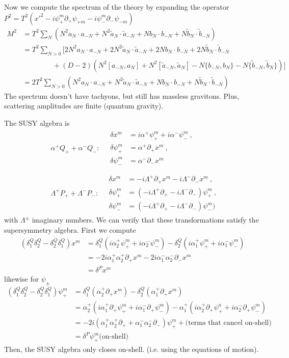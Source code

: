 \documentclass[a4paper,12pt]{article}
\numberwithin{equation}{section}
\numberwithin{exe}{section}
\newcommand{\p}{{\partial}}
\newcommand{\at}{{\tilde a}}
\renewcommand{\a}{{\alpha}}
\renewcommand{\d}{{\delta}}
\renewcommand{\L}{{\Lambda}}
\begin{document}
Now we compute the spectrum of the theory by expanding the operator $P^2 = T^2(x'^2 - i\psi^m_+\p_+\psi_{+m}-i\psi^m_-\p_-\psi_{-m})$
	\begin{align}
	M^2 & = T^2 \sum_N(N^2 a_N\cdot a_{-N} + N^2 \at_N\cdot \at_{-N} + N b_N\cdot b_{-N} + N{\tilde b}_N\cdot {\tilde b}_{-N}) \nonumber \\
	& = T^2 \sum_{N>0} [ 2N^2 a_N\cdot a_{-N} + 2 N^2 \at_N\cdot \at_{-N} + 2N b_N\cdot b_{-N} + 2N{\tilde b}_N\cdot {\tilde b}_{-N} \nonumber \\
	& \qquad\qquad\ +(D-2)(N^2[a_{-N},a_N] + N^2 [\at_{-N},\at_N]- N\{b_{-N},b_N\} - N\{{\tilde b}_{-N},{\tilde b}_N\}) ] \nonumber \\
	& = 2 T^2 \sum_{N>0} (N^2 a_N\cdot a_{-N} + N^2 \at_N\cdot \at_{-N} + N b_N\cdot b_{-N} + N{\tilde b}_N\cdot {\tilde b}_{-N})
	\end{align}
The spectrum doesn't have tachyons, but still has massless gravitons. Plus, scattering amplitudes are finite (quantum gravity).

The SUSY algebra is
	\begin{align}
	&\a^+Q_+ + \a^- Q_-: \quad
		\begin{aligned}
		\d x^m & = i\a^+\psi^m_+ + i\a^-\psi^m_- \ , \\
		\d\psi^m_+ & = \a^+\p_+ x^m\ , \\
		\d\psi^m_- & = \a^-\p_- x^m
		\end{aligned}
	\\
	& \nonumber \\
	& \L^+ P_+ + \L^- P_-: \quad
		\begin{aligned}
		\d x^m & = -i\L^+\p_+ x^m -i\L^-\p_- x^m\ , \\
		\d\psi^m_+ & = (-i\L^+\p_+ -i\L^-\p_-)\psi^m_+\ , \\
		\d\psi^m_- & = (-i\L^+\p_+ - i\L^-\p_-)\psi^m_-)
		\end{aligned}
	\end{align}
with $\L^\pm$ imaginary numbers. We can verify that these transformations satisfy the supersymmetry algebra. First we compute
	\begin{align}
	(\d^Q_1 \d^Q_2 - \d^Q_2 \d^Q_1)x^m & = \d^Q_1 (i\a^+_2 \psi^m_+ + i\a^-_2 \psi^m_-) - \d^Q_2 (i\a^+_1 \psi^m_+ + i\a^-_1\psi^m_-) \nonumber \\
	& = -2i\a^+_1 \a^+_2 \p_+ x^m - 2i\a^-_1\a^-_2 \p_- x^m \nonumber \\
	& = \d^P x^m
	\end{align}
likewise for $\psi_\pm$
	\begin{align}
	(\d^Q_1 \d^Q_2 - \d^Q_2 \d^Q_1)\psi^m_+ & = \d^Q_1 (\a^+_2 \p_+ x^m) - \d^Q_2 (\a^+_1 \p_+ x^m) \nonumber \\
	& = \a^+_2 ( i\a^+_1 \p_+ \psi^m_+ + i\a^-_1 \p_+ \psi^m_-) - \a^+ _1 (i\a^+ _ 2 \p_+ \psi^n_+ + i\a^-_2 \p_+\psi^m_-) \nonumber \\
	& = -2i(\a^+_1 \a^+_2 \p_+ + \a^-_1 \a^-_2 \p_-) \psi^m_+ + \text{(terms that cancel on-shell)} \nonumber \\
	& = \d^P \psi^m_+ \text{(on-shell)}
	\end{align}
Then, the SUSY algebra only closes on-shell. (i.e. using the equations of motion).
\end{document}
